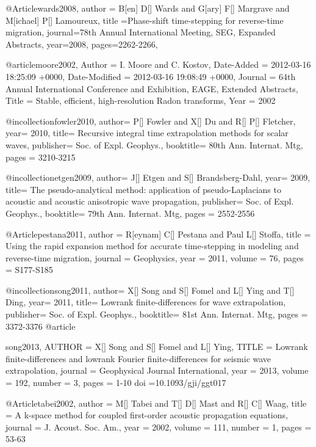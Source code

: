 {@Article{wards2008,
  author = {B[en] D[] Wards and G[ary] F[] Margrave and M[ichael] P[] Lamoureux},
  title ={Phase-shift time-stepping for reverse-time migration},
  journal={78th Annual International Meeting, SEG, Expanded Abstracts},
  year=2008,
  pages={2262-2266},
}

@article{moore2002,
	Author = {I. Moore and C. Kostov},
	Date-Added = {2012-03-16 18:25:09 +0000},
	Date-Modified = {2012-03-16 19:08:49 +0000},
	Journal = {64th Annual International Conference and Exhibition, EAGE, Extended Abstracts},
	Title = {Stable, efficient, high-resolution {R}adon transforms},
	Year = {2002}}

@incollection{fowler2010,
	author=	{P[] Fowler and X[] Du and R[] P[] Fletcher},
	year=	2010,
	title=	{Recursive integral time extrapolation methods 
for scalar waves},
	publisher=	{Soc. of Expl. Geophys.},
	booktitle=	{80th Ann. Internat. Mtg},
        pages = {3210-3215}
	}



@incollection{etgen2009,
	author=	{J[] Etgen and S[] Brandsberg-Dahl},
	year=	2009,
	title=	{The pseudo-analytical method: application of {pseudo-Laplacians} to acoustic and acoustic anisotropic wave propagation},
	publisher=	{Soc. of Expl. Geophys.},
	booktitle=	{79th Ann. Internat. Mtg},
        pages = {2552-2556}
	}

@Article{pestana2011,
  author = 	 {R[eynam] C[] Pestana and Paul L[] Stoffa},
  title = 	 {Using the rapid expansion method for accurate time-stepping in modeling and reverse-time migration},
  journal = 	 {Geophysics},
  year = 	 2011,
  volume = 	 76,
  pages = 	 {S177-S185}}

@incollection{song2011,
	author=	{X[] Song and S[] Fomel and L[] Ying and T[] Ding},
	year=	2011,
	title=	{Lowrank finite-differences for wave extrapolation},
	publisher=	{Soc. of Expl. Geophys.},
	booktitle=	{81st Ann. Internat. Mtg},
        pages = {3372-3376}
	}
@article{song2013,
  AUTHOR = {X[] Song and S[] Fomel and L[] Ying},
  TITLE = {Lowrank finite-differences and lowrank Fourier finite-differences for seismic wave extrapolation},
  journal = {Geophysical Journal International},
  year = 	 {2013},
  volume =       192,
  number = {3},
  pages = {1-10}
  doi =10.1093/gji/ggt017

}
@Article{tabei2002,
  author =       {M[] Tabei and T[] D[] Mast and R[] C[] Waag},
  title =     {A k-space method for coupled first-order acoustic propagation equations}, 
  journal = {J. Acoust. Soc. Am.},
  year =         2002,
  volume =       111,
  number =       1,
  pages =        {53-63}
}

}
